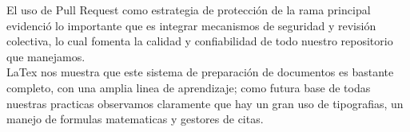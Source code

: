 \documentclass[letterpaper,12pt,oneside]{article}
\begin{document}
El uso de Pull Request como estrategia de protección de la rama principal evidenció lo importante que es integrar mecanismos de seguridad y revisión colectiva, lo cual fomenta la calidad y confiabilidad de todo nuestro repositorio que manejamos. \\

LaTex nos muestra que este sistema de preparación de documentos es bastante completo, con una amplia linea de aprendizaje; como futura base de todas nuestras practicas observamos claramente que hay un gran uso de tipografias, un manejo de formulas matematicas y gestores de citas.   





\printbibliography
\end{document}
